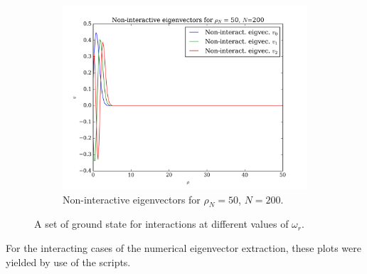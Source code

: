 \documentclass[11pt,a4paper,notitlepage]{article}
\begin{document}
\begin{figure}[H]
\begin{subfigure}[b]{0.45\textwidth}
	\end{subfigure}
\begin{subfigure}[t]{0.45\textwidth}
		\includegraphics[scale=0.40]{../non_interacting_eigvec_plot_rhoN=50_N=200.png}
		\caption{Non-interactive eigenvectors for $\rho_N = 50$, $N = 200$.}\label{fig:eigvecs-non-interact-50-200}
\end{subfigure}
	\caption{A set of ground state for interactions at different values of $\omega_r$.}\label{fig:eigvecs-non-interact}
\end{figure}
For the interacting cases of the numerical eigenvector extraction, these plots were yielded by use of the scripts.
\end{document}
